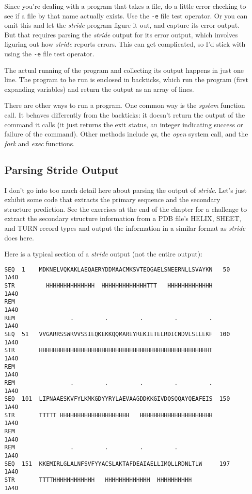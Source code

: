 Since you're dealing with a program that takes a file, do a little error checking to see if a file by that name actually exists. Use the \verb|-e| file test operator. Or you can omit this and let the \textit{stride} program figure it out, and capture its error output. But that requires parsing the \textit{stride} output for its error output, which involves figuring out how \textit{stride} reports errors. This can get complicated, so I'd stick with using the \verb|-e| file test operator.

The actual running of the program and collecting its output happens in just one line. The program to be run is enclosed in backticks, which run the program (first expanding variables) and return the output as an array of lines.

There are other ways to run a program. One common way is the \textit{system} function call. It behaves differently from the backticks: it doesn't return the output of the command it calls (it just returns the exit status, an integer indicating success or failure of the command). Other methods include \textit{qx}, the \textit{open} system call, and the \textit{fork} and \textit{exec} functions. 

\subsection{Parsing Stride Output}
I don't go into too much detail here about parsing the output of \textit{stride}. Let's just exhibit some code that extracts the primary sequence and the secondary structure prediction. See the exercises at the end of the chapter for a challenge to extract the secondary structure information from a PDB file's HELIX, SHEET, and TURN record types and output the information in a similar format as \textit{stride} does here.
  
Here is a typical section of a \textit{stride} output (not the entire output):

\begin{lstlisting}
SEQ  1    MDKNELVQKAKLAEQAERYDDMAACMKSVTEQGAELSNEERNLLSVAYKN   50          1A4O
STR         HHHHHHHHHHHHHH  HHHHHHHHHHHHHTTT   HHHHHHHHHHHHH               1A4O
REM                                                                        1A4O
REM                .         .         .         .         .               1A4O
SEQ  51   VVGARRSSWRVVSSIEQKEKKQQMAREYREKIETELRDICNDVLSLLEKF  100          1A4O
STR       HHHHHHHHHHHHHHHHHHHHHHHHHHHHHHHHHHHHHHHHHHHHHHHHHT               1A4O
REM                                                                        1A4O
REM                .         .         .         .         .               1A4O
SEQ  101  LIPNAAESKVFYLKMKGDYYRYLAEVAAGDDKKGIVDQSQQAYQEAFEIS  150          1A4O
STR       TTTTT HHHHHHHHHHHHHHHHHHHH   HHHHHHHHHHHHHHHHHHHHH               1A4O
REM                                                                        1A4O
REM                .         .         .         .                         1A4O
SEQ  151  KKEMIRLGLALNFSVFYYACSLAKTAFDEAIAELLIMQLLRDNLTLW     197          1A4O
STR       TTTTHHHHHHHHHHHH   HHHHHHHHHHHHH  HHHHHHHHHH                     1A4O
\end{lstlisting}

